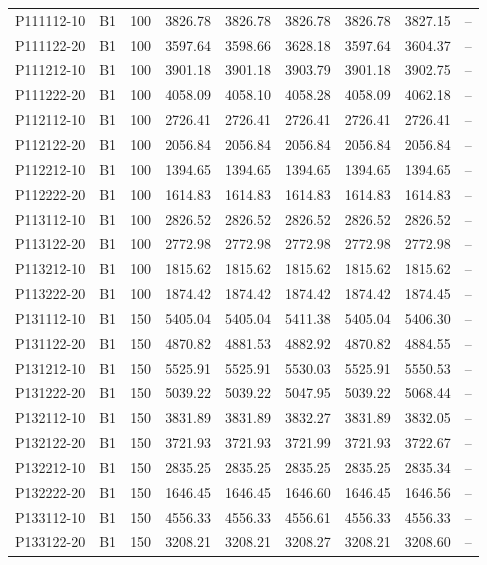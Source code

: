 \begin{longtable}{llrrrrrrr}
 P111112-10 & B1 & 100 & 3826.78 & 3826.78 & 3826.78 & 3826.78 & 3827.15 & -- \\
 P111122-20 & B1 & 100 & 3597.64 & 3598.66 & 3628.18 & 3597.64 & 3604.37 & -- \\
 P111212-10 & B1 & 100 & 3901.18 & 3901.18 & 3903.79 & 3901.18 & 3902.75 & -- \\
 P111222-20 & B1 & 100 & 4058.09 & 4058.10 & 4058.28 & 4058.09 & 4062.18 & -- \\
 P112112-10 & B1 & 100 & 2726.41 & 2726.41 & 2726.41 & 2726.41 & 2726.41 & -- \\
 P112122-20 & B1 & 100 & 2056.84 & 2056.84 & 2056.84 & 2056.84 & 2056.84 & -- \\
 P112212-10 & B1 & 100 & 1394.65 & 1394.65 & 1394.65 & 1394.65 & 1394.65 & -- \\
 P112222-20 & B1 & 100 & 1614.83 & 1614.83 & 1614.83 & 1614.83 & 1614.83 & -- \\
 P113112-10 & B1 & 100 & 2826.52 & 2826.52 & 2826.52 & 2826.52 & 2826.52 & -- \\
 P113122-20 & B1 & 100 & 2772.98 & 2772.98 & 2772.98 & 2772.98 & 2772.98 & -- \\
 P113212-10 & B1 & 100 & 1815.62 & 1815.62 & 1815.62 & 1815.62 & 1815.62 & -- \\
 P113222-20 & B1 & 100 & 1874.42 & 1874.42 & 1874.42 & 1874.42 & 1874.45 & -- \\
 P131112-10 & B1 & 150 & 5405.04 & 5405.04 & 5411.38 & 5405.04 & 5406.30 & -- \\
 P131122-20 & B1 & 150 & 4870.82 & 4881.53 & 4882.92 & 4870.82 & 4884.55 & -- \\
 P131212-10 & B1 & 150 & 5525.91 & 5525.91 & 5530.03 & 5525.91 & 5550.53 & -- \\
 P131222-20 & B1 & 150 & 5039.22 & 5039.22 & 5047.95 & 5039.22 & 5068.44 & -- \\
 P132112-10 & B1 & 150 & 3831.89 & 3831.89 & 3832.27 & 3831.89 & 3832.05 & -- \\
 P132122-20 & B1 & 150 & 3721.93 & 3721.93 & 3721.99 & 3721.93 & 3722.67 & -- \\
 P132212-10 & B1 & 150 & 2835.25 & 2835.25 & 2835.25 & 2835.25 & 2835.34 & -- \\
 P132222-20 & B1 & 150 & 1646.45 & 1646.45 & 1646.60 & 1646.45 & 1646.56 & -- \\
 P133112-10 & B1 & 150 & 4556.33 & 4556.33 & 4556.61 & 4556.33 & 4556.33 & -- \\
 P133122-20 & B1 & 150 & 3208.21 & 3208.21 & 3208.27 & 3208.21 & 3208.60 & -- \\

\end{longtable}
